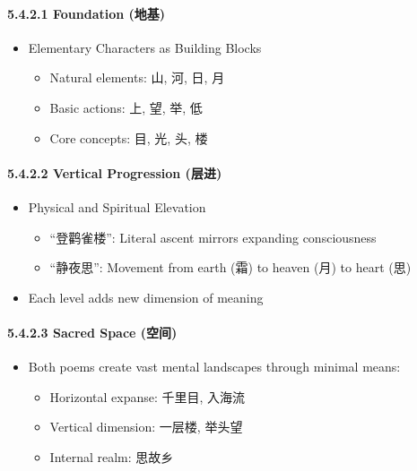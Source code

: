 \documentclass[11pt,letterpaper]{article}
\begin{document}
\paragraph{5.4.2.1 Foundation (地基)}\label{foundation-ux5730ux57fa}

\begin{itemize}
\tightlist
\item
  Elementary Characters as Building Blocks

  \begin{itemize}
  \tightlist
  \item
    Natural elements: 山, 河, 日, 月
  \item
    Basic actions: 上, 望, 举, 低
  \item
    Core concepts: 目, 光, 头, 楼
  \end{itemize}
\end{itemize}

\paragraph{5.4.2.2 Vertical Progression
(层进)}\label{vertical-progression-ux5c42ux8fdb}

\begin{itemize}
\tightlist
\item
  Physical and Spiritual Elevation

  \begin{itemize}
  \tightlist
  \item
    ``登鹳雀楼'': Literal ascent mirrors expanding consciousness
  \item
    ``静夜思'': Movement from earth (霜) to heaven (月) to heart (思)
  \end{itemize}
\item
  Each level adds new dimension of meaning
\end{itemize}

\paragraph{5.4.2.3 Sacred Space (空间)}\label{sacred-space-ux7a7aux95f4}

\begin{itemize}
  \tightlist
  \item
Both poems create vast mental landscapes through minimal means: 

  \begin{itemize}
    \tightlist
    \item 
    Horizontal expanse: 千里目, 入海流 
    \item 
    Vertical dimension: 一层楼, 举头望
    \item 
    Internal realm: 思故乡
  \end{itemize}

\end{itemize}
\end{document}
